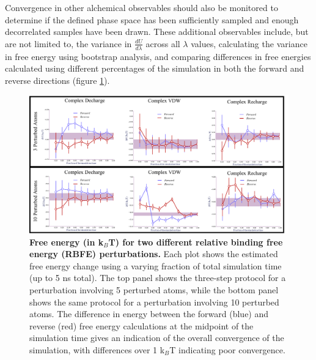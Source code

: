 \documentclass[9pt,bestpractices]{livecoms}
\begin{document}
Convergence in other alchemical observables should also be monitored to determine if the defined phase space has been sufficiently sampled and enough decorrelated samples have been drawn. These additional observables include, but are not
limited to, the variance in $\frac{dU}{d\lambda}$ across all $\lambda$ values, calculating the variance in free energy using bootstrap analysis, and comparing differences in free energies calculated using different percentages of the simulation in both the forward and reverse directions (figure \ref{fig:convergence_forward_reverse}).

\begin{figure}
    \centering
    \includegraphics[width=0.95\linewidth]{figures/fig10_forward_reverse/Figure.pdf}
    \caption{\textbf{Free energy (in k$_{B}$T) for two different relative binding free energy (RBFE) perturbations.} 
    Each plot shows the estimated free energy change using a varying fraction of total simulation time (up to 5 ns total). 
    The top panel shows the three-step protocol for a perturbation involving 5 perturbed atoms, while the bottom panel shows the same protocol for a perturbation involving 10 perturbed atoms. The difference in energy between the forward (blue) and reverse (red) free energy calculations at the midpoint of the simulation time gives an indication of the overall convergence of the simulation, with differences over 1 k$_{B}$T indicating poor convergence.}
    \label{fig:convergence_forward_reverse}
\end{figure}
\end{document}
